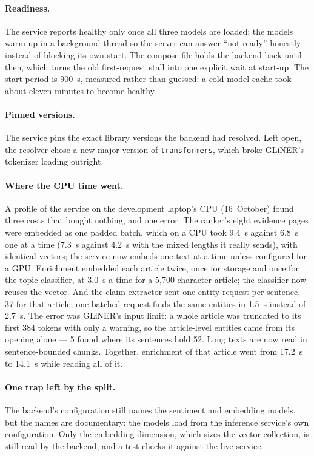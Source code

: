 \paragraph{Readiness.} The service reports healthy only once all three
models are loaded; the models warm up in a background thread so the
server can answer ``not ready'' honestly instead of blocking its own
start. The compose file holds the backend back until then, which turns
the old first-request stall into one explicit wait at start-up. The
start period is 900~s, measured rather than guessed: a cold model cache
took about eleven minutes to become healthy.

\paragraph{Pinned versions.} The service pins the exact library
versions the backend had resolved. Left open, the resolver chose a new
major version of \texttt{transformers}, which broke GLiNER's tokenizer
loading outright.

\paragraph{Where the CPU time went.} A profile of the service on the
development laptop's CPU (16~October) found three costs that bought
nothing, and one error. The ranker's eight evidence pages were embedded
as one padded batch, which on a CPU took 9.4~s against 6.8~s one at a
time (7.3~s against 4.2~s with the mixed lengths it really sends), with
identical vectors; the service now embeds one text at a time unless
configured for a GPU. Enrichment embedded each article twice, once for
storage and once for the topic classifier, at 3.0~s a time for a
5,700-character article; the classifier now reuses the vector. And the
claim extractor sent one entity request per sentence, 37 for that
article; one batched request finds the same entities in 1.5~s instead
of 2.7~s. The error was GLiNER's input limit: a whole article was
truncated to its first 384 tokens with only a warning, so the
article-level entities came from its opening alone --- 5 found where
its sentences hold 52. Long texts are now read in sentence-bounded
chunks. Together, enrichment of that article went from 17.2~s to
14.1~s while reading all of it.

\paragraph{One trap left by the split.} The backend's configuration
still names the sentiment and embedding models, but the names are
documentary: the models load from the inference service's own
configuration. Only the embedding dimension, which sizes the vector
collection, is still read by the backend, and a test checks it against
the live service.
